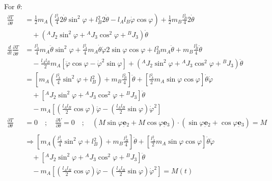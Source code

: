 \documentclass[12pt]{article}
\newcommand{\vb}[1]{{\underset{\tilde{}}{\mathbf{#1}}}}
\begin{document}
\noindent For $\theta$: 
\begin{align*}
    \frac{\partial T}{\partial \dot{\theta}} &= \frac{1}{2}m{}_A \left( \frac{l{}_A^2}{4} 2\dot{\theta}\sin^2\varphi + l{}_B^2 2\dot{\theta} - l{}_A l{}_B \dot{\varphi}\cos\varphi \right) + \frac{1}{2}m{}_B \frac{l{}_B^2}{4} 2\dot{\theta} \\ & \quad + \left({}^A J{}_2 \sin^2\varphi + {}^A J{}_3 \cos^2\varphi + {}^B J{}_3\right) \dot{\theta} \\
    \frac{d}{dt}\frac{\partial T}{\partial \dot{\theta}} &= \frac{l{}_A^2}{4} m{}_A \ddot{\theta}\sin^2\varphi + \frac{l{}_A^2}{4} m{}_A \dot{\theta}\dot{\varphi} 2\sin\varphi\cos\varphi + l{}_B^2 m{}_A \ddot{\theta} + m{}_B \frac{l{}_B^2}{4} \ddot{\theta} \\
    &\quad - \frac{l{}_A l{}_B}{2} m{}_A [\ddot{\varphi}\cos\varphi - \dot{\varphi}^2\sin\varphi] + \left({}^A J{}_2 \sin^2\varphi + {}^A J{}_3 \cos^2\varphi + {}^B J{}_3\right) \ddot{\theta} \\
    &= \left[ m{}_A \left( \frac{l{}_A^2}{4}\sin^2\varphi + l{}_B^2 \right) + m{}_B \frac{l{}_B^2}{4} \right] \ddot{\theta} + \left[ \frac{l{}_A^2}{2} m{}_A \sin\varphi\cos\varphi \right] \dot{\theta}\dot{\varphi}\\ &\quad + \left[ {}^A J{}_2 \sin^2\varphi + {}^A J{}_3 \cos^2\varphi + {}^B J{}_3 \right] \ddot{\theta} \\
    &\quad - m{}_A \left[ \left(\frac{l{}_A l{}_B}{2}\cos\varphi\right)\ddot{\varphi} - \left(\frac{l{}_A l{}_B}{2}\sin\varphi\right)\dot{\varphi}^2 \right] \\
    \frac{\partial T}{\partial \theta} &= 0 \quad ; \quad \frac{\partial V}{\partial \theta} = 0 \quad ; \quad (M\sin\varphi \vb{e}{}_2 + M\cos\varphi \vb{e}{}_3) \cdot (\sin\varphi \vb{e}{}_2 + \cos\varphi \vb{e}{}_3) = M \\
    \\
    &\Rightarrow \left[ m{}_A \left(\frac{l{}_A^2}{4}\sin^2\varphi + l{}_B^2\right) + m{}_B \frac{l{}_B^2}{4} \right] \ddot{\theta} + \left[ \frac{l{}_A^2}{2} m{}_A \sin\varphi \cos\varphi \right] \dot{\theta}\dot{\varphi}\\ &\quad + \left[ {}^A J{}_2 \sin^2\varphi + {}^A J{}_3 \cos^2\varphi + {}^B J{}_3 \right]\ddot{\theta} \\
    &\quad - m{}_A \left[ \left(\frac{l{}_A l{}_B}{2}\cos\varphi\right)\ddot{\varphi} - \left(\frac{l{}_A l{}_B}{2}\sin\varphi\right)\dot{\varphi}^2 \right] = M(t)
\end{align*}
\end{document}
